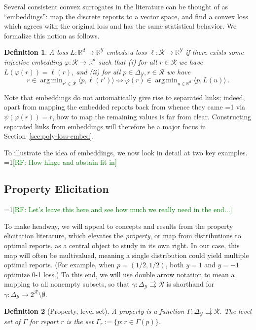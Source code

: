 \documentclass[12pt]{article}
\newcommand{\Comments}{1}
\newcommand{\mynote}[2]{\ifnum\Comments=1\textcolor{#1}{#2}\fi}
\newcommand{\mytodo}[2]{\ifnum\Comments=1%
  \todo[linecolor=#1!80!black,backgroundcolor=#1,bordercolor=#1!80!black]{#2}\fi}
\newcommand{\raf}[1]{\mynote{green}{[RF: #1]}}
\newcommand{\raft}[1]{\mytodo{green!20!white}{RF: #1}}
\newcommand{\reals}{\mathbb{R}}
\newcommand{\simplex}{\Delta_\Y}
\newcommand{\R}{\mathcal{R}}
\newcommand{\Y}{\mathcal{Y}}
\newcommand{\inprod}[2]{\langle #1, #2 \rangle}%
\newcommand{\toto}{\rightrightarrows}
\DeclareMathOperator*{\argmin}{arg\,min}
\newtheorem{definition}{Definition}
\begin{document}
Several consistent convex surrogates in the literature can be thought of as ``embeddings'': map the discrete reports to a vector space, and find a convex loss which agrees with the original loss and has the same statistical behavior.
We formalize this notion as follows.
%
\begin{definition}
  A loss $L:\reals^d\to\reals^\Y$ \emph{embeds} a loss $\ell:\R\to\reals^\Y$ if there exists some injective embedding $\varphi:\R\to\reals^d$ such that
  (i) for all $r\in\R$ we have $L(\varphi(r)) = \ell(r)$, and (ii) for all $p\in\simplex,r\in\R$ we have
  \begin{equation}\label{eq:embed-loss}
    r \in \argmin_{r'\in\R} \inprod{p}{\ell(r')} \iff \varphi(r) \in \argmin_{u\in\reals^d} \inprod{p}{L(u)}~.
  \end{equation}
\end{definition}
%
Note that embeddings do not automatically give rise to separated links; indeed, apart from mapping the embedded reports back from whence they came \raft{I know... just wanted to say that} via $\psi(\varphi(r)) = r$, how to map the remaining values is far from clear.
Constructing separated links from embeddings will therefore be a major focus in Section~\ref{sec:poly-loss-embed}.

To illustrate the idea of embeddings, we now look in detail at two key examples.
\raf{How hinge and abstain fit in}

\subsection{Property Elicitation}

\raf{Let's leave this here and see how much we really need in the end...}

To make headway, we will appeal to concepts and results from the property elicitation literature, which elevates the \emph{property}, or map from distributions to optimal reports, as a central object to study in its own right.
In our case, this map will often be multivalued, meaning a single distribution could yield multiple optimal reports.
(For example, when $p=(1/2,1/2)$, both $y=1$ and $y=-1$ optimize 0-1 loss.)
To this end, we will use double arrow notation to mean a mapping to all nonempty subsets, so that $\gamma: \simplex \toto \R$ is shorthand for $\gamma: \simplex \to 2^{\R} \setminus \emptyset$.

\begin{definition}[Property, level set]\label{def:property}
  A \emph{property} is a function $\Gamma:\simplex\toto\R$.
  The \emph{level set} of $\Gamma$ for report $r$ is the set $\Gamma_r := \{p : r \in \Gamma(p)\}$.
\end{definition}
\end{document}
